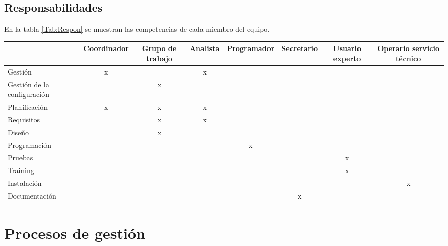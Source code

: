 \documentclass[11pt,a4paper,spanish,twoside]{report}
\begin{document}
\section{Responsabilidades}
En la tabla \ref{Tab:Respon} se muestran las competencias de cada miembro del
equipo.
\begin{sidewaystable}[!h]
  \centering
  \scriptsize
  \begin{tabular}{l|c|c|c|c|c|c|c}
    & \textbf{Coordinador} & \textbf{Grupo de trabajo} &
    \textbf{Analista} & \textbf{Programador} & \textbf{Secretario} &
    \textbf{Usuario experto} & \textbf{Operario servicio técnico}\\
    \hline \hline
    Gestión                     & x &   & x &   &   &   &    \\ 
    \hline
    Gestión de la configuración &   & x &   &   &   &   &    \\
    \hline
    Planificación               & x & x & x &   &   &   &    \\
    \hline
    Requisitos                  &   & x & x &   &   &   &    \\
    \hline
    Diseño                      &   & x &   &   &   &   &    \\
    \hline
    Programación                &   &   &   & x &   &   &    \\
    \hline
    Pruebas                     &   &   &   &   &   & x &    \\
    \hline
    Training                    &   &   &   &   &   & x &    \\
    \hline
    Instalación                 &   &   &   &   &   &   & x  \\
    \hline
    Documentación               &   &   &   &   & x &   &    \\
    \hline
  \end{tabular}
  \caption{Responsabilidades de los miembros} \label{Tab:Respon}
\end{sidewaystable}

\chapter{Procesos de gestión}
\end{document}
